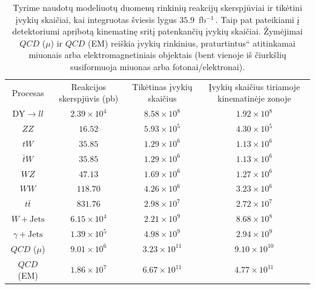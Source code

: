 \documentclass[a4paper, 12pt, oneside]{article}
\newcommand{\ZZ}{Z\! Z}
\newcommand{\WZ}{W\! Z}
\newcommand{\tbarW}{\bar{t}W}
\newcommand{\ttbar}{t\bar{t}}
\newcommand{\gJets}{\gamma\! +\!\mathrm{Jets}}
\newcommand{\WJets}{W\! +\!\mathrm{Jets}}
\newcommand{\ltq}[1]{{\quotedblbase{}#1\textquotedblleft{}}}
\newcommand{\invfb}{fb$^{-1}\,$}
\newcommand{\QCD}{QC\! D}
\newlength\q
\begin{document}
\begin{table}[b!]
	\begin{tabular}{|c|c|c|c|}
		\hline
		\multirow{2}{7em}{\centering Procesas} & \multirow{2}{8em}{\centering Reakcijos skerspjūvis (pb)} &
			\multirow{2}{8em}{\centering Tikėtinas įvykių skaičius} & \multirow{2}{11em}{\centering Įvykių skaičius tiriamoje kinematinėje zonoje} \\
		 & & & \\ 
		\hline\hline
		$\mathrm{DY} \!\!\rightarrow\! ll$ & $2.39\times 10^4$ & $8.58\times 10^8$ & $1.92\times 10^8$ \\ %
		\hline		
		$\ZZ$ & $16.52$ & $5.93\times 10^5$ & $4.30\times 10^5$ \\
		\hline
		$tW$ & $35.85$ & $1.29\times 10^6$ & $1.13\times 10^6$ \\
		\hline
		$\tbarW$ & $35.85$ & $1.29\times 10^6$ & $1.13\times 10^6$ \\
		\hline
		$\WZ$ & $47.13$ & $1.69\times 10^6$ & $1.27\times 10^6$ \\
		\hline
		$WW$ & $118.70$ & $4.26\times 10^6$ & $3.23\times 10^6$ \\
		\hline	
		$\ttbar$ & $831.76$ & $2.98\times 10^7$ & $2.72\times 10^7$ \\
		\hline	
		$\WJets$ & $6.15\times 10^4$ & $2.21\times 10^9$ & $8.68\times 10^8$\\ %
		\hline
		$\gJets$ & $1.39 \times 10^5$ & $4.98\times 10^9$ & $2.94\times 10^9$\\
		\hline
		$\QCD$ ($\mu$) & $9.01\times 10^6$ & $3.23\times 10^{11}$ & $9.10\times 10^{10}$ \\
		\hline
		$\QCD$ (EM) & $1.86\times 10^7$ & $6.67\times 10^{11}$ & $4.77\times 10^{11}$ \\
		\hline
	\end{tabular}
	\caption{\label{table:Xsec} Tyrime naudotų modeliuotų duomenų rinkinių reakcijų skerspjūviai ir tikėtini įvykių skaičiai, kai integruotas
	šviesis lygus $35.9$~\invfb. Taip pat pateikiami į detektoriumi apribotą kinematinę sritį patenkančių įvykių skaičiai.
	Žymėjimai $\QCD$ ($\mu$) ir $\QCD$ (EM) reiškia įvykių rinkinius, \ltq{praturtintus} atitinkamai miuonais arba elektromagnetiniais objektais
	(bent vienoje iš čiurkšlių susiformuoja miuonas arba fotonai/elektronai).}
\end{table}
\end{document}
